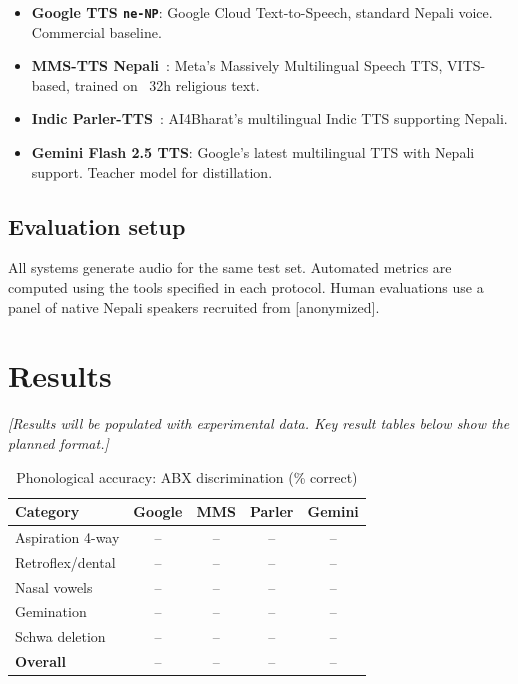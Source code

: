 \documentclass{Interspeech}
\begin{document}
\begin{itemize}
  \item \textbf{Google TTS \texttt{ne-NP}}: Google Cloud Text-to-Speech, standard Nepali voice. Commercial baseline.
  \item \textbf{MMS-TTS Nepali}~\cite{MMS2023}: Meta's Massively Multilingual Speech TTS, VITS-based, trained on ~32h religious text.
  \item \textbf{Indic Parler-TTS}~\cite{IndicParlerTTS2024}: AI4Bharat's multilingual Indic TTS supporting Nepali.
  \item \textbf{Gemini Flash 2.5 TTS}: Google's latest multilingual TTS with Nepali support. Teacher model for distillation.
\end{itemize}

\subsection{Evaluation setup}

All systems generate audio for the same test set. Automated metrics are computed using the tools specified in each protocol. Human evaluations use a panel of native Nepali speakers recruited from [anonymized].

\section{Results}


\textit{[Results will be populated with experimental data. Key result tables below show the planned format.]}

\begin{table}[t]
  \caption{Phonological accuracy: ABX discrimination (\% correct)}
  \label{tab:results_phonological}
  \centering
  \small
  \begin{tabular}{lcccc}
    \toprule
    \textbf{Category} & \textbf{Google} & \textbf{MMS} & \textbf{Parler} & \textbf{Gemini} \\
    \midrule
    Aspiration 4-way & -- & -- & -- & -- \\
    Retroflex/dental & -- & -- & -- & -- \\
    Nasal vowels & -- & -- & -- & -- \\
    Gemination & -- & -- & -- & -- \\
    Schwa deletion & -- & -- & -- & -- \\
    \midrule
    \textbf{Overall} & -- & -- & -- & -- \\
    \bottomrule
  \end{tabular}
\end{table}
\end{document}
